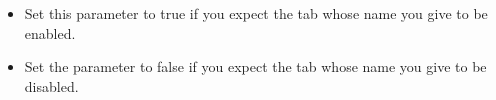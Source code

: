 \begin{itemize}
\item Set this parameter to true if you expect the tab whose name you give to be enabled.
\item Set the parameter to false if you expect the tab whose name you give to be disabled. 
\end{itemize}
